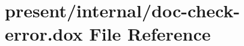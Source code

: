 \hypertarget{doc-check-error_8dox}{\section{present/internal/doc-\/check-\/error.dox File Reference}
\label{doc-check-error_8dox}
}
